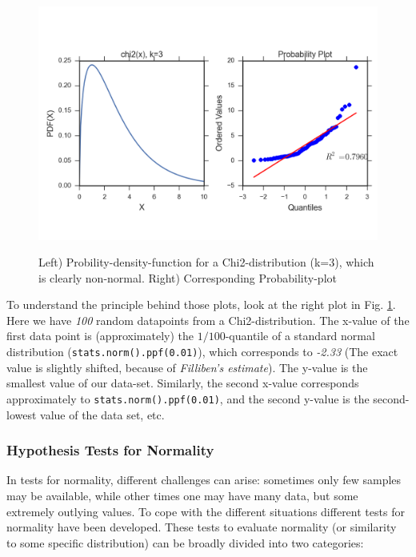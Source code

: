 \begin{figure}
  \centering
  \includegraphics[width=1.0\textwidth]{../Images/chi2pp.png}\\
  \caption{Left) Probility-density-function for a Chi2-distribution (k=3), which is clearly non-normal. Right) Corresponding Probability-plot}\label{fig:qqplotChi2}
\end{figure}

To understand the principle behind those plots, look at the right plot in Fig. \ref{fig:qqplotChi2}. Here we have \emph{100} random datapoints from a Chi2-distribution. The x-value of the first data point is (approximately) the $1/100$-quantile of a standard normal distribution (\lstinline{stats.norm().ppf(0.01)}), which corresponds to \emph{-2.33} (The exact value is slightly shifted, because of \emph{Filliben's estimate}). The y-value is the smallest value of our data-set. Similarly, the second x-value corresponds approximately to \lstinline{stats.norm().ppf(0.01)}, and the second y-value is the second-lowest value of the data set, etc.

\subsubsection{Hypothesis Tests for Normality}

In tests for normality, different challenges can arise: sometimes only few samples may be available, while other times one may have many data, but some extremely outlying values. To cope with the different situations different tests for normality have been developed. These tests to evaluate normality (or similarity to some specific distribution) can be broadly divided into two categories:

